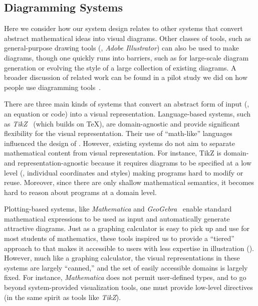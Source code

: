 
\subsection{Diagramming Systems}
\label{sec:RelatedSystems}

Here we consider how our system design relates to other systems that convert abstract mathematical ideas into visual diagrams.  Other classes of tools, such as general-purpose drawing tools (\eg{}, \emph{Adobe Illustrator}) can also be used to make diagrams, though one quickly runs into barriers, such as for large-scale diagram generation or evolving the style of a large collection of existing diagrams.  A broader discussion of related work can be found in a pilot study we did on how people use diagramming tools~\cite{Ni:2020:HDE}.

There are three main kinds of systems that convert an abstract form of input (\eg{}, an equation or code) into a visual representation.  Language-based systems, such as \textit{TikZ}~\cite{TikZ-Manual} (which builds on \TeX), are domain-agnostic and provide significant flexibility for the visual representation. Their use of ``math-like'' languages influenced the design of \Substance.  However, existing systems do not aim to separate mathematical content from visual representation. For instance, TikZ is domain- and representation-agnostic because it requires diagrams to be specified at a low level (\eg{}, individual coordinates and styles) making programs hard to modify or reuse.  Moreover, since there are only shallow mathematical semantics, it becomes hard to reason about programs at a domain level.

Plotting-based systems, like \emph{Mathematica} and \emph{GeoGebra}~\cite{Hohenwarter:2004:CDG} enable standard mathematical expressions to be used as input and automatically generate attractive diagrams.  Just as a graphing calculator is easy to pick up and use for most students of mathematics, these tools inspired us to provide a ``tiered'' approach to \Penrose{} that makes it accessible to users with less expertise in illustration (). However, much like a graphing calculator, the visual representations in these systems are largely ``canned,'' and the set of easily accessible domains is largely fixed.  For instance, \emph{Mathematica} does not permit user-defined types, and to go beyond system-provided visualization tools, one must provide low-level directives (in the same spirit as tools like \textit{TikZ}).

